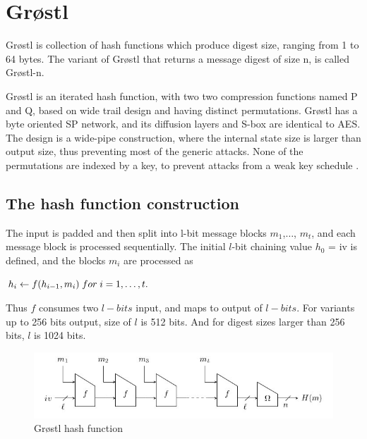 \newpage

\section{Gr{\o}stl}

Gr{\o}stl is collection of hash functions which produce digest size, ranging from 1 to 64 bytes. The variant of
Gr{\o}stl that returns a message digest of size n, is called Gr{\o}stl-n.

Gr{\o}stl is an iterated hash function, with two two compression functions named P and Q, based on wide trail design
and having distinct permutations. Gr{\o}stl has a byte oriented SP network, and its diffusion layers and S-box 
are identical to AES. The design is a wide-pipe construction, where the internal state size is larger than output 
size, thus preventing most of the generic attacks. None of the permutations are indexed by a key, to prevent attacks
from a weak key schedule \cite{00019}.

  \subsection{The hash function construction}

  The input is padded and then split into l-bit message blocks $m_{1}$,$\ldots$, $m_{t}$, and each message block is
  processed sequentially. The initial $l$-bit chaining value $h_{0}$ = iv is defined, and the blocks $m_{i}$ are
  processed as 

  \begin{center}$ h_{i}\gets f(h_{i-1}, m_{i})\thickspace for \thickspace i = 1,\ldots, t.$\end{center}

  Thus $f$ consumes two $l-bits$ input, and maps to output of $l-bits$. For variants up to 256 bits output, size of $l$ is
  512 bits. And for digest sizes larger than 256 bits, $l$ is 1024 bits.

  \begin{figure}[h]
    \begin{center}
      \includegraphics[width=5.5in]{groestlhashfunction.jpg}
    \end{center}
    \caption{Gr{\o}stl hash function \cite{00019}}
    \label{fig:lab}
  \end{figure}


